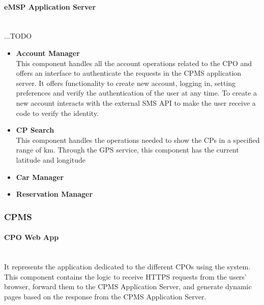 \paragraph*{eMSP Application Server} \hfill \\
...TODO
\begin{itemize}
    \item \textbf{Account Manager} \\ This component handles all the account operations related to the CPO and offers an interface to authenticate
          the requests in the CPMS application server.
          It offers functionality to create new account, logging in, setting preferences and verify the authentication of the user at any time.
          To create a new account interacts with the external SMS API to make the user receive a code to verify the identity.
    \item \textbf{CP Search} \\ This component handles the operations needed to show the CPs in a specified range of km. Through the GPS service,
          this component has the current latitude and longitude
    \item \textbf{Car Manager} \\
    \item \textbf{Reservation Manager} \\
\end{itemize}


\subsubsection{CPMS}

\paragraph*{CPO Web App} \hfill \\
It represents the application dedicated to the different CPOs using the system. This component contains the logic to receive HTTPS requests from the users' browser,
forward them to the CPMS Application Server, and generate dynamic pages based on the response from the CPMS Application Server.

